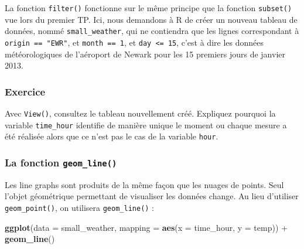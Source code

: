 \documentclass[a4paperpaper,]{article}
\newenvironment{Shaded}{\begin{snugshade}}{\end{snugshade}}
\newcommand{\DataTypeTok}[1]{\textcolor[rgb]{0.00,0.34,0.68}{#1}}
\newcommand{\KeywordTok}[1]{\textcolor[rgb]{0.12,0.11,0.11}{\textbf{#1}}}
\newcommand{\NormalTok}[1]{\textcolor[rgb]{0.12,0.11,0.11}{#1}}
\newcommand{\OperatorTok}[1]{\textcolor[rgb]{0.12,0.11,0.11}{#1}}
\newcommand{\StringTok}[1]{\textcolor[rgb]{0.75,0.01,0.01}{#1}}
\theoremstyle{definition}
\theoremstyle{definition}
\theoremstyle{definition}
\theoremstyle{remark}
\begin{document}
La fonction \texttt{filter()} fonctionne sur le même principe que la
fonction \texttt{subset()} vue lors du premier TP. Ici, nous demandons à
R de créer un nouveau tableau de données, nommé \texttt{small\_weather},
qui ne contiendra que les lignes correspondant à
\texttt{origin\ ==\ "EWR"}, et \texttt{month\ ==\ 1}, et
\texttt{day\ \textless{}=\ 15}, c'est à dire les données météorologiques
de l'aéroport de Newark pour les 15 premiers jours de janvier 2013.

\hypertarget{exercice}{%
\subsubsection{Exercice}\label{exercice}}

Avec \texttt{View()}, consultez le tableau nouvellement créé. Expliquez
pourquoi la variable \texttt{time\_hour} identifie de manière unique le
moment ou chaque mesure a été réalisée alors que ce n'est pas le cas de
la variable \texttt{hour}.

\hypertarget{la-fonction-geom_line}{%
\subsubsection{\texorpdfstring{La fonction
\texttt{geom\_line()}}{La fonction geom\_line()}}\label{la-fonction-geom_line}}

Les line graphs sont produits de la même façon que les nuages de points.
Seul l'objet géométrique permettant de visualiser les données change. Au
lieu d'utiliser \texttt{geom\_point()}, on utilisera
\texttt{geom\_line()} :

\begin{Shaded}
\begin{Highlighting}[]
\KeywordTok{ggplot}\NormalTok{(}\DataTypeTok{data =}\NormalTok{ small_weather, }\DataTypeTok{mapping =} \KeywordTok{aes}\NormalTok{(}\DataTypeTok{x =}\NormalTok{ time_hour, }\DataTypeTok{y =}\NormalTok{ temp)) }\OperatorTok{+}
\StringTok{  }\KeywordTok{geom_line}\NormalTok{()}
\end{Highlighting}
\end{Shaded}
\end{document}
